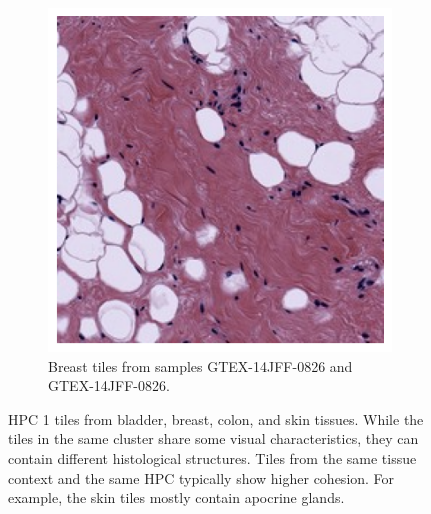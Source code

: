 \documentclass{l4proj}
\begin{document}
\begin{appendices}
\begin{figure}
\begin{subfigure}[b]{\textwidth}
        \includegraphics[width=0.45\linewidth]{images/breast2_1s.png}
        \caption{Breast tiles from samples GTEX-14JFF-0826 and GTEX-14JFF-0826.}
        \label{fig:leiden1_breast}
    \end{subfigure}
    \caption{HPC 1 tiles from  bladder,  breast,  colon, and  skin tissues. While the tiles in the same cluster share some visual characteristics, they can contain different histological structures. Tiles from the same tissue context and the same HPC typically show higher cohesion. For example, the skin tiles mostly contain apocrine glands.}
    

\end{figure}
\end{appendices}
\end{document}
